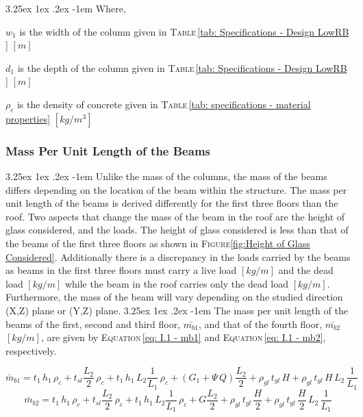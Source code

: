 \documentclass[11pt,a4paper,titlepage]{report}
\makeatletter
\renewcommand\paragraph{\@startsection{paragraph}{5}{\z@}%
  {3.25ex \@plus1ex \@minus.2ex}%
  {-1em}%
  {\normalfont\normalsize\bfseries}}
\makeatother
\begin{document}
\paragraph{}Where,
\begin{itemize}
\begin{small}
    \item $w_1$ is the width of the column given in \textsc{Table}\,\ref{tab: Specifications - Design LowRB } $[m]$
    \item $d_1$ is the depth of the column given in \textsc{Table}\,\ref{tab: Specifications - Design LowRB } $[m]$
    \item $\rho_c$ is the density of concrete given in \textsc{Table}\,\ref{tab: specifications - material properties} $[kg/m^3]$
\end{small}
\end{itemize}
\subsubsection{Mass Per Unit Length of the Beams}
\paragraph{}Unlike the mass of the columns, the mass of the beams differs depending on the location of the beam within the structure. The mass per unit length of the beams is derived differently for the first three floors than the roof. Two aspects that change the mass of the beam in the roof are the height of glass considered, and the loads. The height of glass considered is less than that of the beams of the first three floors as shown in \textsc{Figure}\ref{fig:Height of Glass Considered}. Additionally there is a discrepancy in the loads carried by the beams as beams in the first three floors must carry a live load $[kg/m]$ and the dead load $[kg/m]$ while the beam in the roof carries only the dead load $[kg/m]$. Furthermore, the mass of the beam will vary depending on the studied direction (X,Z) plane or (Y,Z) plane. 
\paragraph{}The mass per unit length of the beams of the first, second and third floor, $\bar{m_{b1}}$, and that of the fourth floor, $\bar{m_{b2}}$ $[kg/m]$, are given by \textsc{Equation}\,\eqref{eq: I.1 - mb1} and \textsc{Equation}\,\eqref{eq: I.1 - mb2}, respectively. 
\begin{small}
\begin{equation}
   \bar{m}_{b1} = t_1\,h_1 \,\rho_c+ t_{sl}\dfrac{L_2}{2} \,\rho_c+ t_1\,h_1\,L_2\dfrac{1}{L_1}\,\rho_c + \left(G_1 + \Psi\,Q\right)\dfrac{L_2}{2} + \rho_{gl}\,t_{gl}\,H+\rho_{gl}\,t_{gl}\,H\,L_2\,\dfrac{1}{L_1}
    \label{eq: I.1 - mb1}
\end{equation}
\begin{equation}
   \bar{m}_{b2} =  t_1\,h_1 \,\rho_c+ t_{sl}\dfrac{L_2}{2} \,\rho_c+ t_1\,h_1\,L_2\dfrac{1}{L_1}\,\rho_c + G\dfrac{L_2}{2} + \rho_{gl}\,t_{gl}\,\dfrac{H}{2}+\rho_{gl}\,t_{gl}\,\dfrac{H}{2}\,L_2\,\dfrac{1}{L_1}
    \label{eq: I.1 - mb2}
\end{equation}
\end{small}
\end{document}
